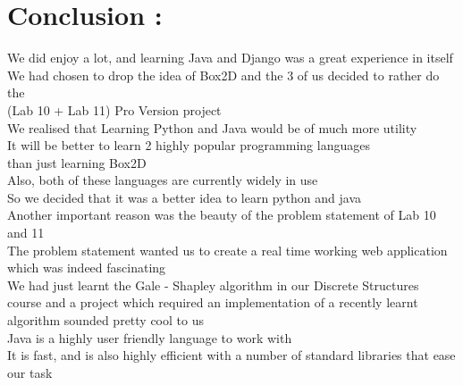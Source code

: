 \documentclass{article}
\begin{document}
\section*{Conclusion : }
\hspace*{5 mm}We did enjoy a lot, and learning Java and Django was a great experience in itself \\
\hspace*{5 mm}We had chosen to drop the idea of Box2D and the 3 of us decided to rather do the \\
\hspace*{5 mm}(Lab 10 + Lab 11) Pro Version project \\
\hspace*{5 mm}We realised that Learning Python and Java would be of much more utility \\
\hspace*{5 mm}It will be better to learn 2 highly popular programming languages \\
\hspace*{5 mm}than just learning Box2D \\
\hspace*{5 mm}Also, both of these languages are currently widely in use \\
\hspace*{5 mm}So we decided that it was a better idea to learn python and java \\
\hspace*{5 mm}Another important reason was the beauty of the problem statement of Lab 10 and 11 \\
\hspace*{5 mm}The problem statement wanted us to create a real time working web application \\
\hspace*{5 mm}which was indeed fascinating \\
\hspace*{5 mm}We had just learnt the Gale - Shapley algorithm in our Discrete Structures \\
\hspace*{5 mm}course and a project which required an implementation of a recently learnt \\
\hspace*{5 mm}algorithm sounded pretty cool to us \\
\hspace*{5 mm}Java is a highly user friendly language to work with \\
\hspace*{5 mm}It is fast, and is also highly efficient with a number of standard libraries that ease our task \\
\end{document}
